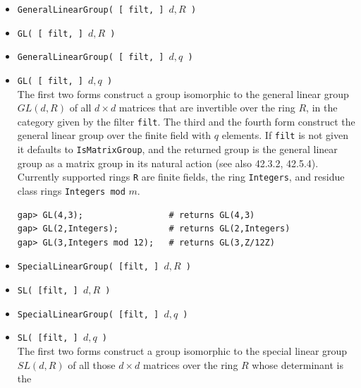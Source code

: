 \documentclass[11pt]{amsart}
\theoremstyle{plain}
\newcommand{\codesize}{\footnotesize}
\newcommand{\<}{\ensuremath{\langle}}
\renewcommand{\>}{\ensuremath{\rangle}}
\begin{document}
\begin{itemize}
\item {\tt GeneralLinearGroup( [ filt, ] $d, R$ )}
\item {\tt GL( [ filt, ] $d, R$ )}
\item {\tt GeneralLinearGroup( [ filt, ] $d, q$ )}
\item {\tt GL( [ filt, ] $d, q$ )}\\
The first two forms construct a group isomorphic to the general linear group 
$GL( d, R )$ of all $d \times d$ matrices that are invertible over
the ring $R$, in the category given by the filter {\tt filt}. 
The third and the fourth form construct the general linear group over the finite
field with $q$ elements.
If {\tt filt} is not given it defaults to {\tt IsMatrixGroup}, and the returned group
is the general linear group as a matrix group in its natural action (see also 42.3.2, 42.5.4).
Currently supported rings {\tt R} are finite fields, the ring {\tt Integers}, and
residue class rings {\tt Integers mod} $m$.
{\codesize
\begin{verbatim}
gap> GL(4,3);                 # returns GL(4,3)
gap> GL(2,Integers);          # returns GL(2,Integers)
gap> GL(3,Integers mod 12);   # returns GL(3,Z/12Z)
\end{verbatim}}
\item {\tt SpecialLinearGroup( [filt, ] $d, R$ )}
\item {\tt SL( [filt, ] $d, R$ )}
\item {\tt SpecialLinearGroup( [filt, ] $d, q$ )}
\item {\tt SL( [filt, ] $d, q$ )}\\
The first two forms construct a group isomorphic to the special linear group 
$SL( d, R )$ of all those $d\times d$ matrices over the ring $R$ whose determinant is the

\end{itemize}
\end{document}
